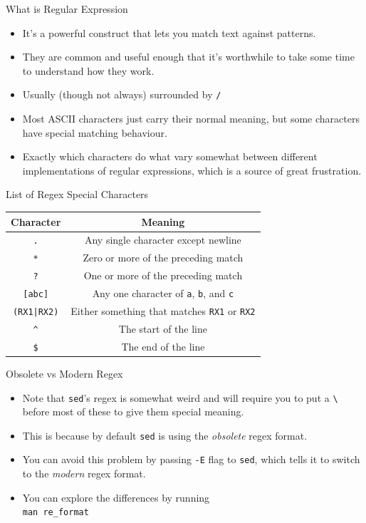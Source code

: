 \documentclass[12pt]{beamer}
\begin{document}
\begin{frame}{What is Regular Expression}
  \begin{itemize}
    \item It's a powerful construct that lets you match text against patterns.
    \item They are common and useful enough that it’s worthwhile to take some time to understand how they work.
    \item Usually (though not always) surrounded by \texttt{/}
    \item Most ASCII characters just carry their normal meaning, but some characters have special matching behaviour.
    \item Exactly which characters do what vary somewhat between different implementations of regular expressions, which is a source of great frustration.
  \end{itemize}
\end{frame}

\begin{frame}{List of Regex Special Characters}
  \begin{tabular}{|c|c|}
    \hline
    \textbf{Character} & \textbf{Meaning}                                            \\ \hline
    \texttt{.}         & Any single character except newline                         \\ \hline
    \texttt{*}         & Zero or more of the preceding match                         \\ \hline
    \texttt{?}         & One or more of the preceding match                          \\ \hline
    \texttt{[abc]}     & Any one character of \texttt{a}, \texttt{b}, and \texttt{c} \\ \hline
    \texttt{(RX1|RX2)} & Either something that matches \texttt{RX1} or \texttt{RX2}  \\ \hline
    \texttt{\^{}}      & The start of the line                                       \\ \hline
    \texttt{\$}        & The end of the line                                         \\ \hline
  \end{tabular}
\end{frame}

\begin{frame}{Obsolete vs Modern Regex}
  \begin{itemize}
    \item Note that \texttt{sed}'s regex is somewhat weird and will require you to put a \texttt{\textbackslash} before most of these to give them special meaning.
    \item This is because by default \texttt{sed} is using the \emph{obsolete} regex format.
    \item You can avoid this problem by passing \texttt{-E} flag to \texttt{sed}, which tells it to switch to the \emph{modern} regex format.
    \item You can explore the differences by running \\\texttt{man re_format}
  \end{itemize}
\end{frame}
\end{document}
